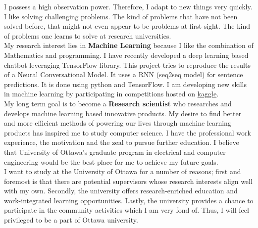 \documentclass{article}
\begin{document}
I possess a high observation power. Therefore, I adapt to new things very quickly. I like solving challenging problems. The kind of problems that have not been solved before, that might not even appear to be problems at first sight. The kind of problems one learns to solve at research universities.\\

My research interest lies in \textbf{Machine Learning} because I like the combination of Mathematics and programming. I have recently developed a deep learning based chatbot leveraging TensorFlow library. This project tries to reproduce the results of a Neural Conversational Model. It uses a RNN (seq2seq model) for sentence predictions. It is done using python and TensorFlow. I am developing new skills in machine learning by participating in competitions hosted on \href{https://www.kaggle.com/}{kaggle}.\\

My long term goal is to become a \textbf{Research scientist} who researches and develops machine learning based innovative products. My desire to find better and more efficient methods of powering our lives through machine learning products has inspired me to study computer science. I have the professional work experience, the motivation and the zeal to pursue further education. I believe that University of Ottawa’s graduate program in electrical and computer engineering would be the best place for me to achieve my future goals.\\

I want to study at the University of Ottawa for a number of reasons; first and foremost is that there are potential supervisors whose research interests align well with my own. Secondly, the university offers research-enriched education and work-integrated learning opportunities. Lastly, the university provides a chance to participate in the community activities which I am very fond of. Thus, I will feel privileged to be a part of Ottawa university.

  
\end{document}
